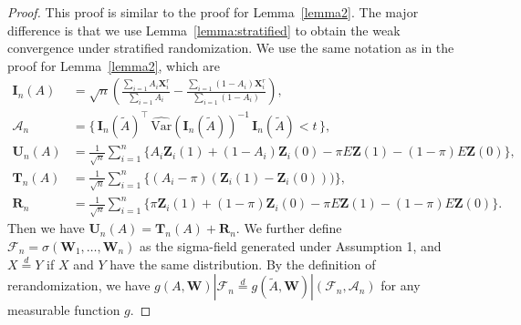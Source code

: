 \documentclass[12pt]{article}
\newcommand{\bX}{\boldsymbol{X}}
\newcommand{\bW}{\boldsymbol{W}}
\newcommand{\bI}{\boldsymbol{I}}
\newcommand{\bZ}{\boldsymbol{Z}}
\newcommand{\bU}{\boldsymbol{U}}
\newcommand{\bR}{\boldsymbol{R}}
\newcommand{\bT}{\boldsymbol{T}}
\newcommand{\tA}{\widetilde{A}}
\begin{document}
\begin{proof}
This proof is similar to the proof for Lemma~\ref{lemma2}. The major difference is that we use Lemma~\ref{lemma:stratified} to obtain the weak convergence under stratified randomization. We use the same notation as in the proof for Lemma~\ref{lemma2}, which are
\begin{align*}
    \bI_n(A) &= \sqrt{n} \left(\frac{\sum_{i=1} A_i \bX_i^r}{\sum_{i=1} A_i} - \frac{\sum_{i=1} (1-A_i) \bX_i^r}{\sum_{i=1} (1-A_i)}\right), \\
    \mathcal A_n &=\Big\{\, \bI_n(\tA)^\top\,\widehat{\mathrm{Var}}(\bI_n(\tA))^{-1}\,\bI_n(\tA)< t\,\Big\},\\
    \bU_n(A) &=\frac{1}{\sqrt n}\sum_{i=1}^n\!\Big\{A_i \bZ_i(1)+(1-A_i)\bZ_i(0)-\pi E\bZ(1)-(1-\pi)E\bZ(0)\Big\},\\
    \bT_n(A) &= \frac{1}{\sqrt n}\sum_{i=1}^n\!\Big\{(A_i-\pi) (\bZ_i(1)-\bZ_i(0)))\Big\},\\
    \bR_n &= \frac{1}{\sqrt n}\sum_{i=1}^n\!\Big\{\pi \bZ_i(1)+(1-\pi)\bZ_i(0)-\pi E\bZ(1)-(1-\pi)E\bZ(0)\Big\}.
\end{align*}
Then we have $\bU_n(A) = \bT_n(A) + \bR_n$. We further define $\mathcal{F}_n = \sigma(\bW_1,\dots,\bW_n)$ as the sigma-field generated under Assumption 1, and $X \overset{d}{=} Y$ if $X$ and $Y$ have the same distribution. By the definition of rerandomization, we have $g(A,\bW)| \mathcal{F}_n \overset{d}{=} g(\tA,\bW)| (\mathcal{F}_n, \mathcal{A}_n)$ for any measurable function $g$.


\end{proof}
\end{document}
